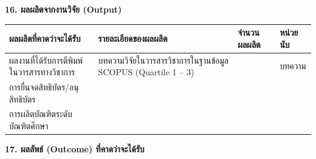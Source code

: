 \documentclass[16pt]{extarticle}
\newcounter{none} %
\begin{document}
\textbf{16. ผลผลิตจากงานวิจัย (Output)}

{\def\LTcaptype{none} %
\begin{longtable}[]{@{}
  >{\raggedright\arraybackslash}p{}
  >{\raggedright\arraybackslash}p{}
  >{\raggedright\arraybackslash}p{}
  >{\raggedright\arraybackslash}p{}@{}}
\toprule\noalign{}
\begin{minipage}[b]{\linewidth}\centering
\textbf{ผลผลิตที่คาดว่าจะได้รับ}
\end{minipage} & \begin{minipage}[b]{\linewidth}\centering
\textbf{รายละเอียดของผลผลิต}
\end{minipage} & \begin{minipage}[b]{\linewidth}\centering
\textbf{จำนวนผลผลิต}
\end{minipage} & \begin{minipage}[b]{\linewidth}\centering
\textbf{หน่วยนับ}
\end{minipage} \\
\midrule\noalign{}
\endhead
\bottomrule\noalign{}
\endlastfoot
ผลงานที่ได้รับการตีพิมพ์ในวารสารทางวิชาการ & บทความวิจัยในวารสารวิชาการในฐานข้อมูล
SCOPUS (Quartile 1 -- 3) & 1 & บทความ \\
การยื่นจดสิทธิบัตร/อนุสิทธิบัตร & & & \\
การผลิตบัณฑิตระดับบัณฑิตศึกษา & & & \\
\end{longtable}
}

\textbf{17. ผลลัพธ์ (Outcome) ที่คาดว่าจะได้รับ}
\end{document}
